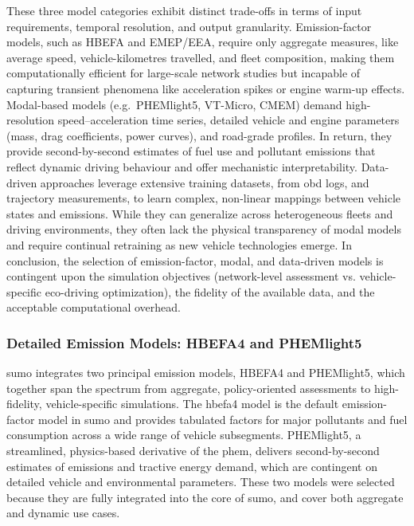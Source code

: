 These three model categories exhibit distinct trade-offs in terms of input requirements, temporal resolution, and output granularity. Emission-factor models, such as HBEFA and EMEP/EEA, require only aggregate measures, like average speed, vehicle-kilometres travelled, and fleet composition, making them computationally efficient for large-scale network studies but incapable of capturing transient phenomena like acceleration spikes or engine warm-up effects. Modal-based models (e.g.\ PHEMlight5, VT-Micro, CMEM) demand high-resolution speed–acceleration time series, detailed vehicle and engine parameters (mass, drag coefficients, power curves), and road-grade profiles. In return, they provide second-by-second estimates of fuel use and pollutant emissions that reflect dynamic driving behaviour and offer mechanistic interpretability. Data-driven approaches leverage extensive training datasets, from \ac{obd} logs, and trajectory measurements, to learn complex, non-linear mappings between vehicle states and emissions. While they can generalize across heterogeneous fleets and driving environments, they often lack the physical transparency of modal models and require continual retraining as new vehicle technologies emerge. In conclusion, the selection of emission-factor, modal, and data-driven models is contingent upon the simulation objectives (network-level assessment vs. vehicle-specific eco-driving optimization), the fidelity of the available data, and the acceptable computational overhead.  

\subsubsection{Detailed Emission Models: HBEFA4 and PHEMlight5}
\label{subsubsec:detailed_emission_models}

\ac{sumo} integrates two principal emission models, HBEFA4 and PHEMlight5, which together span the spectrum from aggregate, policy-oriented assessments to high-fidelity, vehicle-specific simulations. The \ac{hbefa}4 model is the default emission-factor model in \ac{sumo} and provides tabulated factors for major pollutants and fuel consumption across a wide range of vehicle subsegments. PHEMlight5, a streamlined, physics-based derivative of the \ac{phem}, delivers second-by-second estimates of emissions and tractive energy demand, which are contingent on detailed vehicle and environmental parameters. These two models were selected because they are fully integrated into the core of \ac{sumo}, and cover both aggregate and dynamic use cases. \cite{Krajzewicz2002}

